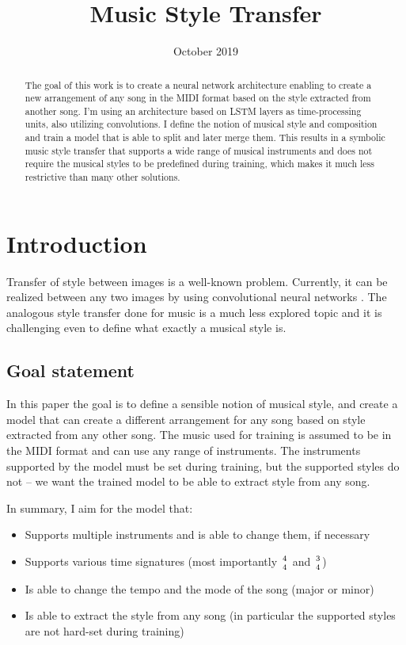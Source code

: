 \documentclass[en]{pracamgr}
\title{Music Style Transfer}
\date{October 2019}
\begin{document}
\maketitle

\begin{abstract}
    The goal of this work is to create a neural network architecture enabling to create a new arrangement of any song in the MIDI format based on the style extracted from another song.
    I'm using an architecture based on LSTM layers as time-processing units, also utilizing convolutions.
    I define the notion of musical style and composition and train a model that is able to split and later merge them.
    This results in a symbolic music style transfer that supports a wide range of musical instruments and does not require the musical styles to be predefined during training, which makes it much less restrictive than many other solutions.
\end{abstract}

\tableofcontents
\listoffigures

\chapter{Introduction}

Transfer of style between images is a well-known problem.
Currently, it can be realized between any two images by using convolutional neural networks \cite{image_style_transfer}.
The analogous style transfer done for music is a much less explored topic and it is challenging even to define what exactly a musical style is.

\section{Goal statement}

In this paper the goal is to define a sensible notion of musical style, and create a model that can create a different arrangement for any song based on style extracted from any other song.
The music used for training is assumed to be in the MIDI format and can use any range of instruments.
The instruments supported by the model must be set during training, but the supported styles do not -- we want the trained model to be able to extract style from any song.

In summary, I aim for the model that:

\begin{itemize}
    \item Supports multiple instruments and is able to change them, if necessary
    \item Supports various time signatures (most importantly $4\atop4$ and $3\atop4$)
    \item Is able to change the tempo and the mode of the song (major or minor)
    \item Is able to extract the style from any song (in particular the supported styles are not hard-set during training)
\end{itemize}
\end{document}
